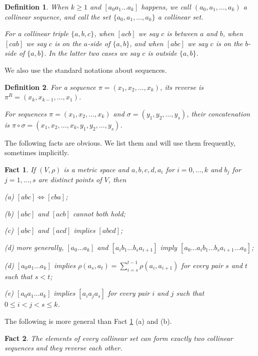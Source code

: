 \documentclass[12pt]{article}
\newtheorem{fact}{Fact}
\newtheorem{defi}{Definition}
\begin{document}
\begin{defi}\label{defi.collinear_set_triple}
When $k \ge 1$ and $[a_0 a_1 ... a_k]$ happens, we call $(a_0, a_1, \dots, a_k)$
a {\em collinear sequence}, and call the set $\{a_0, a_1, \dots, a_k \}$ a collinear set.

For a collinear triple $\{a, b, c\}$, when $[acb]$ we say $c$ is {\em between} $a$ and $b$,
when $[cab]$ we say $c$ is on the {\em $a$-side} of $\{a, b\}$,
and when $[abc]$ we say $c$ is on the {\em $b$-side} of $\{a, b\}$.
In the latter two cases we say $c$ is {\em outside} $\{a, b\}$.
\end{defi}

We also use the standard notations about sequences.

\begin{defi}
For a sequence $\pi = (x_1, x_2, \dots, x_k)$,
its {\em reverse} is $\pi^R = (x_k, x_{k-1}, \dots, x_1)$.

For sequences $\pi = (x_1, x_2, \dots, x_k)$ and $\sigma = (y_1, y_2, \dots, y_s)$,
their {\em concatenation} is $\pi \circ \sigma = (x_1, x_2, \dots, x_k, y_1, y_2, \dots, y_s)$.
\end{defi}

The following facts are obvious. We list them and will use them frequently,
sometimes implicitly.

\begin{fact}\label{fact.collinear}
 If $(V,\rho)$ is a metric space and $a,b,c,d,a_i$ for $i=0,...,k$ and $b_j$ for $j=1,...,s$ are distinct points of $V$, then

(a) $[abc] \Leftrightarrow [cba]$;

(b) $[abc]$ and $[acb]$ cannot both hold;

(c) $[abc]$ and $[acd]$ implies $[abcd]$;

(d) more generally, $[a_0\dots a_k]$ and $[a_i b_1 \dots b_s a_{i+1}]$
imply $[a_0 \dots a_i b_1 \dots b_s a_{i+1} \dots a_k]$;

(d) $[a_0a_1...a_k]$ implies $\rho(a_s, a_t) = \sum_{i=s}^{t-1} \rho(a_i, a_{i+1})$ 
for every pair $s$ and $t$ such that $s < t$;

(e) $[a_0a_1...a_k]$ implies $[a_i a_j a_s]$ for every pair $i$ and $j$ such that $0 \leq i < j < s \leq k$.
\end{fact}

The following is more general than Fact \ref{fact.collinear} (a) and (b).

\begin{fact}\label{fact.two_ordering}
The elements of every collinear set can form exactly two collinear sequences
and they reverse each other.
\end{fact}
\end{document}
